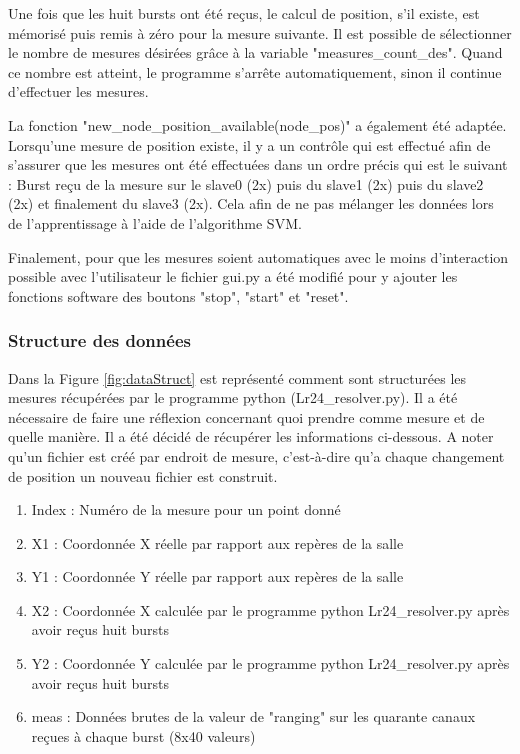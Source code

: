 Une fois que les huit bursts ont été reçus, le calcul de position, s’il existe, est mémorisé puis remis à zéro pour la mesure suivante. Il est possible de sélectionner le nombre de mesures désirées grâce à la variable "measures\_count\_des". Quand ce nombre est atteint, le programme s'arrête automatiquement, sinon il continue d'effectuer les mesures.

La fonction "new\_node\_position\_available(node\_pos)" a également été adaptée. Lorsqu'une mesure de position existe, il y a un contrôle qui est effectué afin de s'assurer que les mesures ont été effectuées dans un ordre précis qui est le suivant : Burst reçu de la mesure sur le slave0 (2x) puis du slave1 (2x) puis du slave2 (2x) et finalement du slave3 (2x). Cela afin de ne pas mélanger les données lors de l'apprentissage à l'aide de l'algorithme SVM. 

Finalement, pour que les mesures soient automatiques avec le moins d'interaction possible avec l'utilisateur le fichier gui.py a été modifié pour y ajouter les fonctions software des boutons "stop", "start" et "reset". 

\subsubsection{Structure des données}

Dans la Figure \ref{fig:dataStruct} est représenté comment sont structurées les mesures récupérées par le programme python (Lr24\_resolver.py). Il a été nécessaire de faire une réflexion concernant quoi prendre comme mesure et de quelle manière. Il a été décidé de récupérer les informations ci-dessous. A noter qu'un fichier est créé par endroit de mesure, c'est-à-dire qu'a chaque changement de position un nouveau fichier est construit.

\begin{enumerate}
 \item Index : Numéro de la mesure pour un point donné
 \item X1 : Coordonnée X réelle par rapport aux repères de la salle 
 \item Y1 : Coordonnée Y réelle par rapport aux repères de la salle 
 \item X2 : Coordonnée X calculée par le programme python Lr24\_resolver.py après avoir reçus huit bursts
 \item Y2 : Coordonnée Y calculée par le programme python Lr24\_resolver.py après avoir reçus huit bursts
 \item meas : Données brutes de la valeur de "ranging" sur les quarante canaux reçues à chaque burst (8x40 valeurs)
\end{enumerate}

